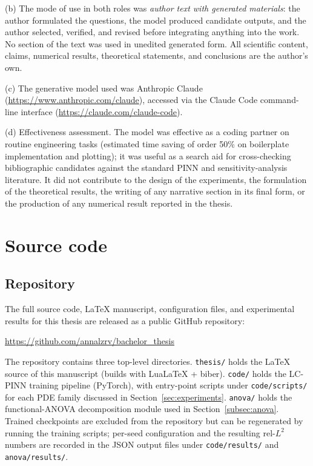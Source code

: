 \documentclass[12pt,a4paper]{extarticle}
\begin{document}
(b) The mode of use in both roles was \emph{author text with generated materials}: the author formulated the questions, the model produced candidate outputs, and the author selected, verified, and revised before integrating anything into the work. No section of the text was used in unedited generated form. All scientific content, claims, numerical results, theoretical statements, and conclusions are the author's own.

(c) The generative model used was Anthropic Claude (\url{https://www.anthropic.com/claude}), accessed via the Claude Code command-line interface (\url{https://claude.com/claude-code}).

(d) Effectiveness assessment. The model was effective as a coding partner on routine engineering tasks (estimated time saving of order 50\% on boilerplate implementation and plotting); it was useful as a search aid for cross-checking bibliographic candidates against the standard PINN and sensitivity-analysis literature. It did not contribute to the design of the experiments, the formulation of the theoretical results, the writing of any narrative section in its final form, or the production of any numerical result reported in the thesis.

\newpage

\printbibliography[heading=bibintoc, title={References}]

\newpage

\appendix

\section{Source code}
\label{app:code}

\subsection{Repository}

The full source code, LaTeX manuscript, configuration files, and experimental results for this thesis are released as a public GitHub repository:
\begin{center}
\url{https://github.com/annalzrv/bachelor_thesis}
\end{center}

The repository contains three top-level directories. \texttt{thesis/} holds the LaTeX source of this manuscript (builds with LuaLaTeX + biber). \texttt{code/} holds the LC-PINN training pipeline (PyTorch), with entry-point scripts under \texttt{code/scripts/} for each PDE family discussed in Section~\ref{sec:experiments}. \texttt{anova/} holds the functional-ANOVA decomposition module used in Section~\ref{subsec:anova}. Trained checkpoints are excluded from the repository but can be regenerated by running the training scripts; per-seed configuration and the resulting rel-$L^2$ numbers are recorded in the JSON output files under \texttt{code/results/} and \texttt{anova/results/}.
\end{document}

